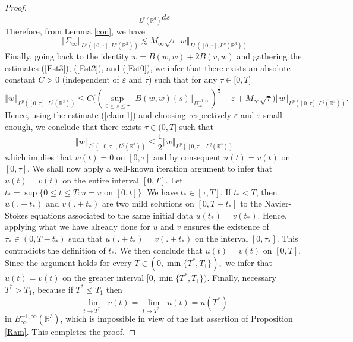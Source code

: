 \documentclass[10pt,a4paper]{amsart}
\begin{document}
\begin{proof}
\[_{L^{q}(\mathbb{R}^{3})}ds
\]
Therefore, from Lemma \ref{con}, we have
\begin{equation}\label{Est0}
\left\Vert \Sigma_{\infty }\right\Vert _{L^{p}([0,\tau ],L^{q}(\mathbb{R}^{3}))}\lesssim M_{\infty }\sqrt{\tau }\left\Vert w\right\Vert_{L^{p}([0,\tau ],L^{q}(\mathbb{R}^{3}))}
\end{equation}
Finally, going back to the identity $w=B(w,w)+2B(v,w)$ and gathering the
estimates (\ref{Est3}), (\ref{Est2}), and (\ref{Est0}), we infer that
there exists an absolute constant $C>0$ (independent of $\varepsilon $ and $%
\tau $) such that for any $\tau \in \lbrack 0,T]$%
\[
\left\Vert w\right\Vert _{L^{p}([0,\tau ],L^{q}(\mathbb{R}^{3}))}\leq
C\big((\sup_{0\leq s\leq \tau }\left\Vert B(w,w)(s)\right\Vert
_{B_{\infty }^{-1,\infty }})^\frac{1}{2}+\varepsilon +M_{\infty }\sqrt{\tau }\big) \left\Vert
w\right\Vert _{L^{p}([0,\tau ],L^{q}(\mathbb{R}^{3}))}.
\]%
Hence, using the estimate (\ref{claim1}) and  choosing respectively $\varepsilon $ and $\tau $ small enough, we conclude that there exists $\tau \in (0,T]$ such
that
\[
\left\Vert w\right\Vert _{L^{p}([0,\tau ],L^{q}(\mathbb{R}^{3}))}\leq \frac{1%
}{2}\left\Vert w\right\Vert _{L^{p}([0,\tau ],L^{q}(\mathbb{R}^{3}))}
\]%
which implies that $w(t)=0$ on $[0,\tau ]$ and by consequent $u(t)=v(t)$ on $%
[0,\tau ].$ We shall now apply a well-known iteration argument to infer that  $u(t)=v(t)$ on the entire interval $[0,T].$ Let $t_\ast=\sup\{0\leq t\leq T: u=v  \text{ on } [0,t]\}$. We have $t_\ast\in[\tau,T].$ If $t_\ast<T$, then $u(.+t_\ast)$ and $v(.+t_\ast)$ are two mild solutions on $[0,T-t_\ast]$ to the Navier-Stokes equations associated to the same initial data $u(t_\ast)=v(t_\ast)$. Hence, applying what we have already done for $u$ and $v$ ensures the existence of $\tau_\ast\in(0,T-t_\ast)$ such that $u(.+t_\ast)=v(.+t_\ast)$ on the interval $[0,\tau_\ast ]$. This contradicts the definition of $t_\ast$. We then conclude that $u(t)=v(t)$ on $[0,T]$. Since the argument holds for every  $ T\in (0,\min\{T^\ast,T_1\}),$ we infer  that $u(t)=v(t)$ on the greater interval $[0,\min\{T^\ast,T_1\}).$ Finally, necessary  $T^\ast> T_1$, because if $T^\ast\leq T_1$ then
$$\lim_{t\to T^{\ast -}}v(t)=\lim_{t\to T^{\ast -}}u(t)=u(T^\ast)$$
in $B^{-1,\infty}_\infty(\mathbb{R}^3)$, which is impossible in view of  the last assertion of Proposition \ref{Ram}. This completes  the proof.
\end{proof}
\end{document}
